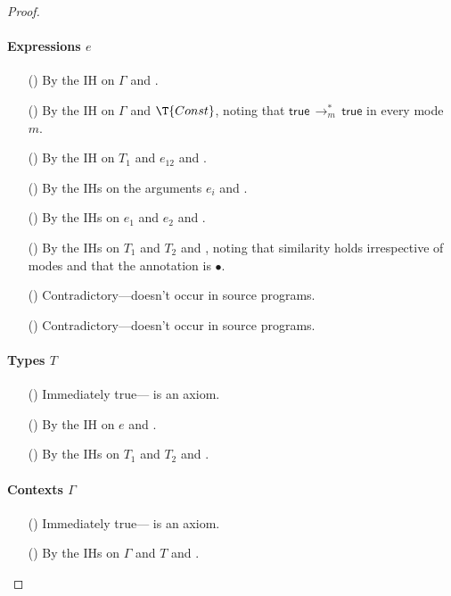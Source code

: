 \documentclass[9pt]{extarticle}
\newcommand{\ottnt}[1]{\mathit{#1}}
\newcommand{\ottmv}[1]{\mathit{#1}}
\begin{document}
{\begin{lemma}
\begin{proof}
{\paragraph{Expressions $\ottnt{e}$}
    \begin{itemize}
    \item[(\T{Var})] By the IH on $\Gamma$ and .
    \item[(\T{Const})] By the IH on $\Gamma$ and $\T{Const}$, noting
      that $ \mathsf{true}  \,  \longrightarrow ^{*}_{ \ottnt{m} }  \,  \mathsf{true} $ in every mode $\ottnt{m}$.
    \item[(\T{Abs})] By the IH on $\ottnt{T_{{\mathrm{1}}}}$ and $\ottnt{e_{{\mathrm{12}}}}$ and .
    \item[(\T{Op})] By the IHs on the arguments $\ottnt{e_{\ottmv{i}}}$ and .
    \item[(\T{App})] By the IHs on $\ottnt{e_{{\mathrm{1}}}}$ and $\ottnt{e_{{\mathrm{2}}}}$ and .
    \item[(\T{Cast})] By the IHs on $\ottnt{T_{{\mathrm{1}}}}$ and $\ottnt{T_{{\mathrm{2}}}}$ and
      , noting that similarity holds irrespective of modes and
      that the annotation is $ \bullet $.
    \item[(\T{Blame})] Contradictory---doesn't occur in source programs.
    \item[(\T{Check})] Contradictory---doesn't occur in source programs.
    \end{itemize}
    
    \paragraph{Types $\ottnt{T}$}
    \begin{itemize}
    \item[(\WF{Base})] Immediately true--- is an axiom.
    \item[(\WF{Refine})] By the IH on $\ottnt{e}$ and .
    \item[(\WF{Fun})] By the IHs on $\ottnt{T_{{\mathrm{1}}}}$ and $\ottnt{T_{{\mathrm{2}}}}$ and .
    \end{itemize}

    \paragraph{Contexts $\Gamma$}
    \begin{itemize}
    \item[(\WF{Empty})] Immediately true--- is an axiom.
    \item[(\WF{Extend})] By the IHs on $\Gamma$ and $\ottnt{T}$ and
      .
    \end{itemize}
    \fi}
  \end{proof}
\end{lemma}

}
\end{document}
